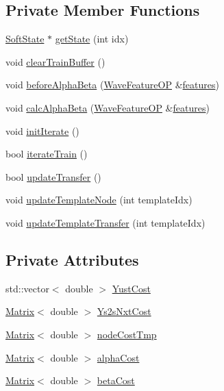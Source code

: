 \subsection*{Private Member Functions}
\begin{DoxyCompactItemize}
\item 
\hyperlink{class_soft_state}{Soft\+State} $\ast$ \hyperlink{class_h_m_m_soft_automaton_a64b264ab97c10c015dd3951dcc0ab876}{get\+State} (int idx)
\item 
void \hyperlink{class_h_m_m_soft_automaton_a0761925dd18d2111c15e22414fa57bbb}{clear\+Train\+Buffer} ()
\item 
void \hyperlink{class_h_m_m_soft_automaton_ade39618b914aa92c7981af121a61ed5a}{before\+Alpha\+Beta} (\hyperlink{class_wave_feature_o_p}{Wave\+Feature\+O\+P} \&\hyperlink{lpc2cep_8m_afcc1d2df0288347ea10603033506e33b}{features})
\item 
void \hyperlink{class_h_m_m_soft_automaton_a9d9a82629bf46fe3bc4bd2bc58123a22}{calc\+Alpha\+Beta} (\hyperlink{class_wave_feature_o_p}{Wave\+Feature\+O\+P} \&\hyperlink{lpc2cep_8m_afcc1d2df0288347ea10603033506e33b}{features})
\item 
void \hyperlink{class_h_m_m_soft_automaton_aa5d4e88fe215f24a5eaa12c60db22793}{init\+Iterate} ()
\item 
bool \hyperlink{class_h_m_m_soft_automaton_a884b343c9fa895b4b4ef5dfe9cb7b34d}{iterate\+Train} ()
\item 
bool \hyperlink{class_h_m_m_soft_automaton_a599134520b7f52af954dddf0c431194a}{update\+Transfer} ()
\item 
void \hyperlink{class_h_m_m_soft_automaton_a158630545b1dd4bbdf1c853d44a88722}{update\+Template\+Node} (int template\+Idx)
\item 
void \hyperlink{class_h_m_m_soft_automaton_a7267e6775f4e702c94b8b89418e11504}{update\+Template\+Transfer} (int template\+Idx)
\end{DoxyCompactItemize}
\subsection*{Private Attributes}
\begin{DoxyCompactItemize}
\item 
std\+::vector$<$ double $>$ \hyperlink{class_h_m_m_soft_automaton_af71284a9b8b08b442aff84a41a89b47e}{Yust\+Cost}
\item 
\hyperlink{configure__basic_8h_a566a006016cf65b1b01bd2bc633e1c12}{Matrix}$<$ double $>$ \hyperlink{class_h_m_m_soft_automaton_ab27fbd9c234c186025e864a216fb5081}{Ys2s\+Nxt\+Cost}
\item 
\hyperlink{configure__basic_8h_a566a006016cf65b1b01bd2bc633e1c12}{Matrix}$<$ double $>$ \hyperlink{class_h_m_m_soft_automaton_ab31c1d1e1011fe8488e44fe944390a72}{node\+Cost\+Tmp}
\item 
\hyperlink{configure__basic_8h_a566a006016cf65b1b01bd2bc633e1c12}{Matrix}$<$ double $>$ \hyperlink{class_h_m_m_soft_automaton_a01e5c46f2bdfbbb6f838c1a9b7c6da21}{alpha\+Cost}
\item 
\hyperlink{configure__basic_8h_a566a006016cf65b1b01bd2bc633e1c12}{Matrix}$<$ double $>$ \hyperlink{class_h_m_m_soft_automaton_a4e2558ddec8bd8bf0eb4dd25e241d6e9}{beta\+Cost}
\end{DoxyCompactItemize}

